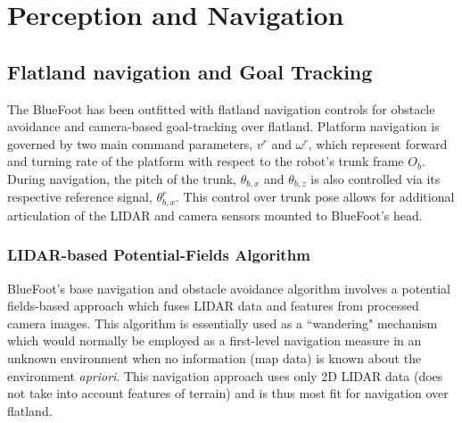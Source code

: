 \chapter{Perception and Navigation}
\label{ch::navigation}


	\section{Flatland navigation and Goal Tracking}
	
		The BlueFoot has been outfitted with flatland navigation controls for obstacle avoidance and camera-based goal-tracking over flatland. Platform navigation is governed by two main command parameters, $v^{r}$ and $\omega^{r}$, which represent forward and turning rate of the platform with respect to the robot's trunk frame $O_{b}$. During navigation, the pitch of the trunk, $\theta_{b,x}$ and $\theta_{b,z}$ is also controlled via its respective reference signal, $\theta_{b,x}^{r}$. This control over trunk pose allows for additional articulation of the LIDAR and camera sensors mounted to BlueFoot's head. 

		\subsection{LIDAR-based Potential-Fields Algorithm}
		BlueFoot's base navigation and obstacle avoidance algorithm involves a potential fields-based approach which fuses LIDAR data and features from processed camera images. This algorithm is essentially used as a ``wandering" mechanism which would normally be employed as a first-level navigation measure in an unknown environment when no information (\EG map data) is known about the environment \emph{apriori}. This navigation approach uses only 2D LIDAR data (does not take into account features of terrain) and is thus most fit for navigation over flatland.

